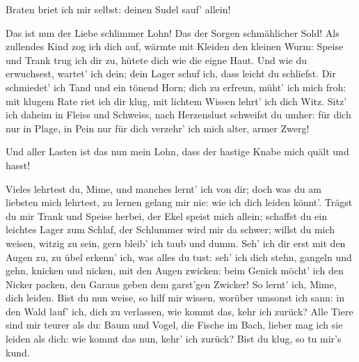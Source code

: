 \begin{drama}
\Siegfriedspeaks

Braten briet ich mir selbst:
deinen Sudel sauf' allein!

\Mimespeaks


Das ist nun der Liebe
schlimmer Lohn!
Das der Sorgen
schmählicher Sold!
Als zullendes Kind
zog ich dich auf,
wärmte mit Kleiden
den kleinen Wurm:
Speise und Trank
trug ich dir zu,
hütete dich
wie die eigne Haut.
Und wie du erwuchsest,
wartet' ich dein;
dein Lager schuf ich,
dass leicht du schliefst.
Dir schmiedet' ich Tand
und ein tönend Horn;
dich zu erfreun,
müht' ich mich froh:
mit klugem Rate
riet ich dir klug,
mit lichtem Wissen
lehrt' ich dich Witz.
Sitz' ich daheim
in Fleiss und Schweiss,
nach Herzenslust
schweifst du umher:
für dich nur in Plage,
in Pein nur für dich
verzehr' ich mich alter,
armer Zwerg!


Und aller Lasten
ist das nun mein Lohn,
dass der hastige Knabe
mich quält und hasst!



\Siegfriedspeaks

Vieles lehrtest du, Mime,
und manches lernt' ich von dir;
doch was du am liebsten mich lehrtest,
zu lernen gelang mir nie:
wie ich dich leiden könnt'.
Trägst du mir Trank
und Speise herbei,
der Ekel speist mich allein;
schaffst du ein leichtes
Lager zum Schlaf,
der Schlummer wird mir da schwer;
willst du mich weisen,
witzig zu sein,
gern bleib' ich taub und dumm.
Seh' ich dir erst
mit den Augen zu,
zu übel erkenn' ich,
was alles du tust:
seh' ich dich stehn,
gangeln und gehn,
knicken und nicken,
mit den Augen zwicken:
beim Genick möcht' ich
den Nicker packen,
den Garaus geben
dem garst'gen Zwicker!
So lernt' ich, Mime, dich leiden.
Bist du nun weise,
so hilf mir wissen,
worüber umsonst ich sann:
in den Wald lauf' ich,
dich zu verlassen,
wie kommt das, kehr ich zurück?
Alle Tiere sind
mir teurer als du:
Baum und Vogel,
die Fische im Bach,
lieber mag ich sie
leiden als dich:
wie kommt das nun, kehr' ich zurück?
Bist du klug, so tu mir's kund.

\Mimespeaks



\end{drama}

